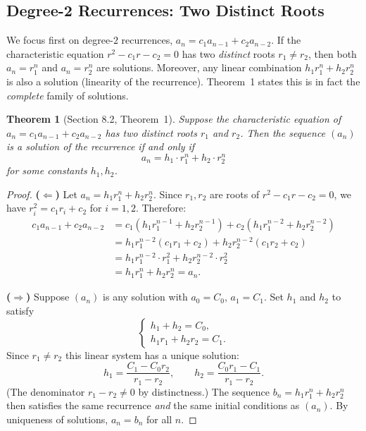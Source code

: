 \documentclass[11pt, a4paper, notitlepage]{report}
\newtheorem{theorem}{Theorem}[section]
\theoremstyle{definition}
\theoremstyle{remark}
\begin{document}
\subsection{Degree-2 Recurrences: Two Distinct Roots}
\label{subsec:deg2-distinct}

We focus first on degree-$2$ recurrences, $a_n = c_1 a_{n-1} + c_2 a_{n-2}$.  If the
characteristic equation $r^2 - c_1 r - c_2 = 0$ has two \emph{distinct} roots $r_1 \neq r_2$,
then both $a_n = r_1^n$ and $a_n = r_2^n$ are solutions.  Moreover, any linear combination
$h_1 r_1^n + h_2 r_2^n$ is also a solution (linearity of the recurrence).  Theorem~1 states
this is in fact the \emph{complete} family of solutions.

\begin{theorem}[Section 8.2, Theorem~1]
\label{thm:deg2-distinct}
Suppose the characteristic equation of $a_n = c_1 a_{n-1} + c_2 a_{n-2}$ has two distinct
roots $r_1$ and $r_2$.  Then the sequence $(a_n)$ is a solution of the recurrence if and
only if
\[
  a_n = h_1 \cdot r_1^n + h_2 \cdot r_2^n
\]
for some constants $h_1, h_2$.
\end{theorem}

\begin{proof}
\textbf{($\Leftarrow$)} Let $a_n = h_1 r_1^n + h_2 r_2^n$.  Since $r_1, r_2$ are roots of
$r^2 - c_1 r - c_2 = 0$, we have $r_i^2 = c_1 r_i + c_2$ for $i = 1,2$.  Therefore:
\begin{align*}
  c_1 a_{n-1} + c_2 a_{n-2}
    &= c_1(h_1 r_1^{n-1} + h_2 r_2^{n-1}) + c_2(h_1 r_1^{n-2} + h_2 r_2^{n-2}) \\
    &= h_1 r_1^{n-2}(c_1 r_1 + c_2) + h_2 r_2^{n-2}(c_1 r_2 + c_2) \\
    &= h_1 r_1^{n-2} \cdot r_1^2 + h_2 r_2^{n-2} \cdot r_2^2 \\
    &= h_1 r_1^n + h_2 r_2^n = a_n.
\end{align*}

\textbf{($\Rightarrow$)} Suppose $(a_n)$ is any solution with $a_0 = C_0$, $a_1 = C_1$.
Set $h_1$ and $h_2$ to satisfy
\[
  \begin{cases} h_1 + h_2 = C_0, \\ h_1 r_1 + h_2 r_2 = C_1. \end{cases}
\]
Since $r_1 \neq r_2$ this linear system has a unique solution:
\[
  h_1 = \frac{C_1 - C_0 r_2}{r_1 - r_2}, \qquad
  h_2 = \frac{C_0 r_1 - C_1}{r_1 - r_2}.
\]
(The denominator $r_1 - r_2 \neq 0$ by distinctness.)  The sequence $b_n = h_1 r_1^n + h_2 r_2^n$
then satisfies the same recurrence \emph{and} the same initial conditions as $(a_n)$.  By
uniqueness of solutions, $a_n = b_n$ for all $n$.
\end{proof}
\end{document}

